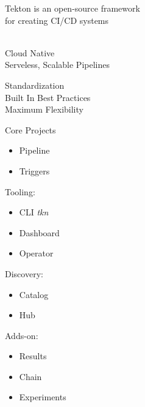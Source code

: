 \documentclass[aspectratio=169,11pt,hyperref={colorlinks=true}]{beamer}
\begin{document}
\begin{stripedframe}%
  {%
  Tekton is an open-source framework \\ for creating CI/CD systems \\ ~
  }%
  {%
  Cloud Native \\
  \vspace{0.03\textheight}
  Serveless, Scalable Pipelines \\
  \vspace{0.1\textheight}
  \centering
  
  }%
  {%
  Standardization \\
  \vspace{0.03\textheight}
  Built In Best Practices \\
  \vspace{0.03\textheight}
  Maximum Flexibility \\
  }%
  {%
  Core Projects
  \begin{itemize}
    \item Pipeline
    \item Triggers
  \end{itemize}
  \vspace{0.01\textheight}
  Tooling:
  \begin{itemize}
    \item CLI \textit{tkn}
    \item Dashboard
    \item Operator
  \end{itemize}
  }%
  {%
  Discovery:
  \begin{itemize}
    \item Catalog
    \item Hub
  \end{itemize}
  \vspace{0.01\textheight}
  Adds-on:
  \begin{itemize}
    \item Results
    \item Chain
    \item Experiments
  \end{itemize}
  }%
\end{stripedframe}
\end{document}
